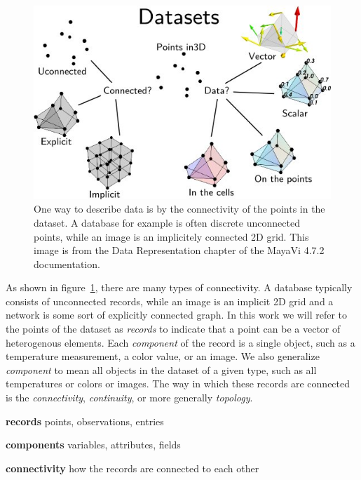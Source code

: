 \documentclass[../main.tex]{subfiles}
\begin{document}
\begin{figure}[H]
    \includegraphics[width=1\textwidth]{figures/intro/dataset_diagram.png}
    \caption{One way to describe data is by the connectivity of the points in the dataset. A database for example is often discrete unconnected points, while an image is an implicitely connected 2D grid. This image is from the Data Representation chapter of the MayaVi 4.7.2 documentation.\cite{DataRepresentationMayavi}}
    \label{fig:intro_data_format}
\end{figure}
As shown in figure~\ref{fig:intro_data_format}, there are many types of connectivity. A database typically consists of unconnected records, while an image is an implicit 2D grid and a network is some sort of explicitly connected graph.  In this work we will refer to the points of the dataset as \textit{records} to indicate that a point can be a vector of heterogenous elements. Each \textit{component} of the record is a single object, such as a temperature measurement, a color value, or an image. We also generalize \textit{component} to mean all objects in the dataset of a given type, such as all temperatures or colors or images. The way in which these records are connected is the \textit{connectivity}, \textit{continuity}, or more generally \textit{topology}.

\begin{mdframed}[roundcorner=10pt, frametitle= definitions, frametitlerule=true, frametitlebackgroundcolor=gray!10]
\begin{definition}
    \item[\textbf{records}] points, observations, entries 
    \item[\textbf{components}] variables, attributes, fields 
    \item[\textbf{connectivity}] how the records are connected to each other
\end{definition}
\end{mdframed}
\end{document}
